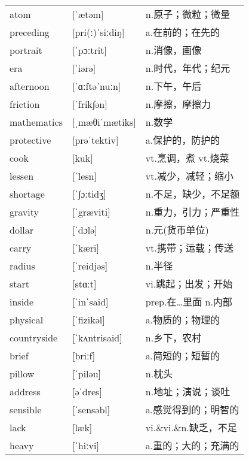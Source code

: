 \documentclass[a4paper]{article}
\begin{document}
\section{}
\begin{tabular}{l l l}

atom & [ˈætəm] & n.原子；微粒；微量 \\
preceding & [pri(ː)ˈsiːdiŋ] & a.在前的；在先的 \\
portrait & [ˈpɔːtrit] & n.消像，画像 \\
era & [ˈiərə] & n.时代，年代；纪元 \\
afternoon & [ˈɑːftəˈnuːn] & n.下午，午后 \\
friction & [ˈfrik∫ən] & n.摩擦，摩擦力 \\
mathematics & [ˌmæθiˈmætiks] & n.数学 \\
protective & [prəˈtektiv] & a.保护的，防护的 \\
cook & [kuk] & vt.烹调，煮 vt.烧菜 \\
lessen & [ˈlesn] & vt.减少，减轻；缩小 \\
shortage & [ˈ∫ɔːtidʒ] & n.不足，缺少，不足额 \\
gravity & [ˈgræviti] & n.重力，引力；严重性 \\
dollar & [ˈdɔlə] & n.元(货币单位) \\
carry & [ˈkæri] & vt.携带；运载；传送 \\
radius & [ˈreidjəs] & n.半径 \\
start & [stɑːt] & vi.跳起；出发；开始 \\
inside & [ˈinˈsaid] & prep.在…里面 n.内部 \\
physical & [ˈfizikəl] & a.物质的；物理的 \\
countryside & [ˈkʌntrisaid] & n.乡下，农村 \\
brief & [briːf] & a.简短的；短暂的 \\
pillow & [ˈpiləu] & n.枕头 \\
address & [əˈdres] & n.地址；演说；谈吐 \\
sensible & [ˈsensəbl] & a.感觉得到的；明智的 \\
lack & [læk] & vi.\&vi.\&n.缺乏，不足 \\
heavy & [ˈhiːvi] & a.重的；大的；充满的 \\

\end{tabular}
\end{document}
